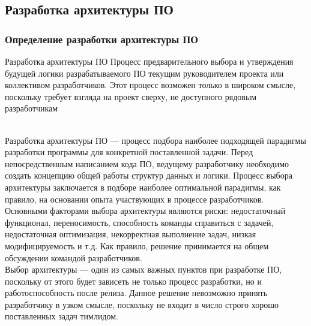 \documentclass{../industrial-development}
\begin{document}
\subsection{Разработка архитектуры ПО}
\begin{frame} \frametitle{Определение разработки архитектуры ПО}
  \begin{block}{Разработка архитектуры ПО}
  	Процесс предварительного выбора и утверждения будущей логики разрабатываемого ПО текущим руководителем проекта или коллективом разработчиков. Этот процесс возможен только в широком смысле, поскольку требует взгляда на проект сверху, не доступного рядовым разработчикам 
  \end{block}{}	
\end{frame}
\lecturenotes
\\Разработка архитектуры ПО --- процесс подбора наиболее подходящей парадигмы разработки программы для конкретной поставленной задачи. Перед непосредственным написанием кода ПО, ведущему разработчику необходимо создать концепцию общей работы структур данных и логики. Процесс выбора архитектуры заключается в подборе наиболее оптимальной парадигмы, как правило, на основании опыта участвующих в процессе разработчиков.
Основными факторами выбора архитектуры являются риски: недостаточный функционал, переносимость, способность команды справиться с задачей, недостаточная оптимизация, некорректная выполнение задач, низкая модифицируемость и т.д. Как правило, решение принимается на общем обсуждении командой разработчиков.\\
Выбор архитектуры --- один из самых важных пунктов при разработке ПО, поскольку от этого будет зависеть не только процесс разработки, но и работоспособность после релиза. Данное решение невозможно принять разработчику в узком смысле, поскольку не входит в число строго хорошо поставленных задач тимлидом.
\end{document}
